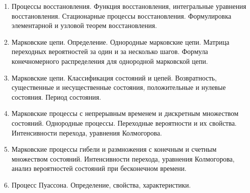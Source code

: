 %
%

\begin{enumerate}

\item Процессы восстановления. Функция восстановления, интегральные уравнения восстановления. Стационарные процессы восстановления. Формулировка элементарной и узловой теорем восстановления.

\item Марковские цепи. Определение. Однородные марковские цепи. Матрица переходных вероятностей за один и за несколько шагов. Формула конечномерного распределения для однородной марковской цепи.

\item Марковские цепи. Классификация состояний и цепей. Возвратность, существенные и несущественные состояния, положительные и нулевые состояния. Период состояния.

\item Марковские процессы с непрерывным временем и дискретным множеством состояний. Однородные процессы. Переходные вероятности и их свойства. Интенсивности перехода, уравнения Колмогорова.

\item Марковские процессы гибели и размножения с конечным и счетным множеством состояний. Интенсивности перехода, уравнения Колмогорова, анализ вероятностей состояний при бесконечном времени.

\item Процесс Пуассона. Определение, свойства, характеристики.

\end{enumerate}



